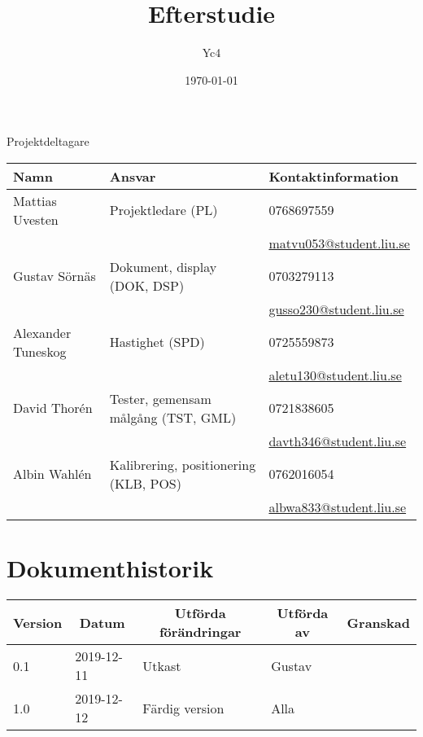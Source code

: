 \documentclass[10pt,oneside,swedish]{lips}
\title{Efterstudie}
\author{Yc4}
\date{\today}
\begin{document}
\maketitle

\cleardoublepage
\makeprojectid

\begin{center}
  \Large Projektdeltagare
\end{center}
\begin{center}
  \begin{tabular}{|l|l|l|} \hline
    \textbf{Namn} & \textbf{Ansvar} & \textbf{Kontaktinformation }\\\hline

    Mattias Uvesten & Projektledare (PL) & 0768697559\\
    && \url{matvu053@student.liu.se} \\\hline

    Gustav Sörnäs & Dokument, display (DOK, DSP) & 0703279113\\
    && \url{gusso230@student.liu.se} \\\hline

    Alexander Tuneskog & Hastighet (SPD) & 0725559873 \\
    && \url{aletu130@student.liu.se} \\\hline

    David Thorén & Tester, gemensam målgång (TST, GML) & 0721838605 \\
    && \url{davth346@student.liu.se} \\\hline

    Albin Wahlén & Kalibrering, positionering (KLB, POS) & 0762016054 \\
    && \url{albwa833@student.liu.se} \\\hline
  \end{tabular}
\end{center}

\cleardoublepage
\tableofcontents

\cleardoublepage
\section*{Dokumenthistorik}
\begin{tabular}{|p{}|p{}|p{}|p{}|p{}|} 
  \hline
  \multicolumn{1}{|c}{\bfseries Version} &
  \multicolumn{1}{|c}{\bfseries Datum} &
  \multicolumn{1}{|c}{\bfseries Utförda förändringar} &
  \multicolumn{1}{|c}{\bfseries Utförda av} &
  \multicolumn{1}{|c|}{\bfseries Granskad}\\
  \hline \hline
  0.1 & 2019-12-11 & Utkast & Gustav & \\\hline
	1.0 & 2019-12-12 & Färdig version & Alla & \\\hline
\end{tabular}
\end{document}
